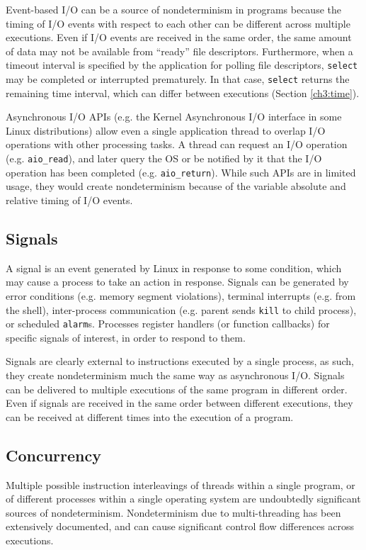 Event-based I/O can be a source
of nondeterminism in programs because the
timing of I/O events with respect to each other
can be different across multiple executions.
Even if I/O events are received in the same order,
the same amount of data may not be available
from ``ready'' file descriptors. Furthermore, when a timeout
interval is specified by the application for polling file descriptors,
\texttt{select} may be completed or interrupted
prematurely. In that case, \texttt{select} returns
the remaining time interval, which can     
differ between executions (Section \ref{ch3:time}).

 \newline
Asynchronous I/O APIs (e.g. the Kernel Asynchronous I/O interface
in some Linux distributions) allow even a single application
thread to overlap I/O operations with other processing
tasks. A thread can request an I/O operation (e.g. \texttt{aio\_read}),
and later query the OS or be notified by it that the I/O operation
has been completed (e.g. \texttt{aio\_return}). While such APIs are in limited
usage, they would create nondeterminism because of the
variable absolute and relative timing of I/O events.

\subsection{Signals}\label{ch3:sig}
A signal is an event generated by Linux
in response to some condition, which may cause
a process to take an action in response.
Signals can be generated by error conditions
(e.g. memory segment violations), 
terminal interrupts (e.g. from the shell), 
inter-process communication (e.g. parent 
sends \texttt{kill} to child process),
or scheduled \texttt{alarm}s. 
Processes register handlers (or function callbacks) for specific signals
of interest, in order to respond to them.

Signals are clearly external to
instructions executed by a single process,
as such, they create nondeterminism 
much the same way as asynchronous I/O.
Signals can be delivered to multiple executions
of the same program in different order.
Even if signals are received in the
same order between different executions,
they can be received at different times
into the execution of a program.

\subsection{Concurrency} \label{ch3:concurrency}
Multiple possible instruction interleavings of 
threads within a single program, 
or of different processes within 
a single operating system are
undoubtedly significant sources
of nondeterminism.
Nondeterminism due to
multi-threading has been extensively
documented, and can cause
significant control flow differences
across executions.

